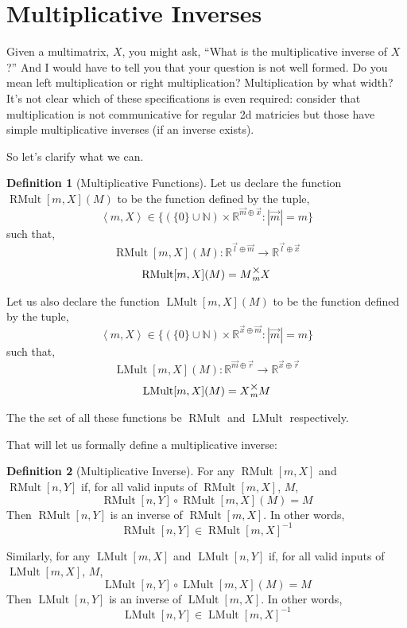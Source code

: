 \documentclass[12pt]{book}
\theoremstyle{plain}
\theoremstyle{definition}
\newtheorem{definition}{Definition}[chapter]
\theoremstyle{ppart}
\theoremstyle{case}
\theoremstyle{solution}
\DeclareMathOperator{\RMult}{RMult}
\DeclareMathOperator{\LMult}{LMult}
\newcommand{\mmult}[1]{\text{\raisebox{1ex}{$\underset{#1}{\times}$}}}
\newcommand{\shape}[1]{\left|#1\right|}
\begin{document}
\section{Multiplicative Inverses}

Given a multimatrix, $X$, you might ask, ``What is the multiplicative inverse of $X$?''
And I would have to tell you that your question is not well formed. Do you mean left multiplication
or right multiplication? Multiplication by what width? It's not clear which of these specifications
is even required: consider that multiplication is not communicative for regular 2d matricies but
those have simple multiplicative inverses (if an inverse exists). 

So let's clarify what we can.

\begin{definition}[Multiplicative Functions]
Let us declare the function $\RMult[m,X](M)$ to be the function defined 
by the tuple,
\[ \left<m,X\right> \in \{  (\{0\} \cup \mathbb{N}) \times \mathbb{R}^{\vec{m} \oplus \vec{x}}  :  \shape{\vec{m}} = m \} \]
such that,
\[ \RMult[m,X](M) : \mathbb{R}^{\vec{l} \oplus \vec{m}} \to \mathbb{R}^{\vec{l} \oplus \vec{x}} \]
\[ \RMult[m,X](M) = M \mmult{m} X \]

Let us also declare the function $\LMult[m,X](M)$ to be the function defined 
by the tuple,
\[ \left<m,X\right> \in \{  (\{0\} \cup \mathbb{N}) \times \mathbb{R}^{\vec{x} \oplus \vec{m}}  :  \shape{\vec{m}} = m \} \]
such that,
\[ \LMult[m,X](M) : \mathbb{R}^{\vec{m} \oplus \vec{r}} \to \mathbb{R}^{\vec{x} \oplus \vec{r}} \]
\[ \LMult[m,X](M) = X \mmult{m} M \]

The the set of all these functions be $\RMult$ and $\LMult$ respectively.
\end{definition}

That will let us formally define a multiplicative inverse:

\begin{definition}[Multiplicative Inverse]
For any $\RMult[m,X]$ and $\RMult[n,Y]$ if, for all valid inputs of $\RMult[m,X]$, $M$,
\[ \RMult[n,Y] \circ \RMult[m,X] (M) = M \]
Then $\RMult[n,Y]$ is an inverse of $\RMult[m,X]$. In other words,
\[ \RMult[n,Y] \in \RMult[m,X]^{-1} \]

Similarly, for any $\LMult[m,X]$ and $\LMult[n,Y]$ if, for all valid inputs of $\LMult[m,X]$, $M$,
\[ \LMult[n,Y] \circ \LMult[m,X] (M) = M \]
Then $\LMult[n,Y]$ is an inverse of $\LMult[m,X]$. In other words,
\[ \LMult[n,Y] \in \LMult[m,X]^{-1} \]
\end{definition}
\end{document}
